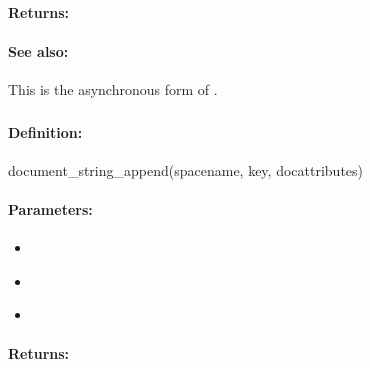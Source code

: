 \paragraph{Returns:}


\paragraph{See also:}  This is the asynchronous form of .

\pagebreak
\subsubsection{}
\label{api:ruby:document_string_append}


\paragraph{Definition:}
\begin{rubycode}
document_string_append(spacename, key, docattributes)
\end{rubycode}

\paragraph{Parameters:}
\begin{itemize}[noitemsep]
\item {}\\

\item {}\\

\item {}\\

\end{itemize}

\paragraph{Returns:}


\pagebreak
\subsubsection{}
\label{api:ruby:async_document_string_append}


